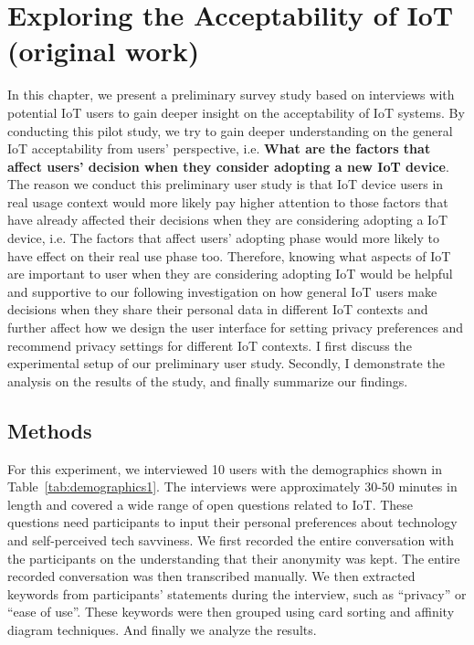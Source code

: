 
\chapter{Exploring the Acceptability of IoT (original work)}\label{chapter:acceptability}

In this chapter, we present a preliminary survey study based on interviews with potential IoT users to gain deeper insight on the acceptability of IoT systems. By conducting this pilot study, we try to gain deeper understanding on the general IoT acceptability from users' perspective, i.e. \textbf{What are the factors that affect users' decision when they consider adopting a new IoT device}. The reason we conduct this preliminary user study is that IoT device users in real usage context would more likely pay higher attention to those factors that have already affected their decisions when they are considering adopting a IoT device, i.e. The factors that affect users' adopting phase would more likely to have effect on their real use phase too. Therefore, knowing what aspects of IoT are important to user when they are considering adopting IoT would be helpful and supportive to our following investigation on how general IoT users make decisions when they share their personal data in different IoT contexts and further affect how we design the user interface for setting privacy preferences and recommend privacy settings for different IoT contexts. I first discuss the experimental setup of our preliminary user study. Secondly, I demonstrate the analysis on the results of the study, and finally summarize our findings.

\section{Methods}

For this experiment, we interviewed 10 users with the demographics shown in Table~\ref{tab:demographics1}. The interviews were approximately 30-50 minutes in length and covered a wide range of open questions related to IoT. These questions need participants to input their personal preferences about technology and self-perceived tech savviness. We first recorded the entire conversation with the participants on the understanding that their anonymity was kept. The entire recorded conversation was then transcribed manually. We then extracted keywords from participants' statements during the interview, such as ``privacy'' or ``ease of use''. These keywords were then grouped using card sorting and affinity diagram techniques. And finally we analyze the results.

